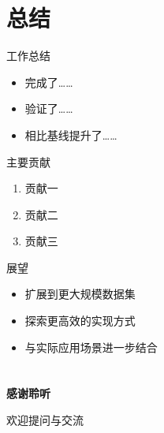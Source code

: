 \documentclass[10pt,aspectratio=169,mathserif]{beamer}
\begin{document}
\section{总结}

\begin{frame}{工作总结}
    \begin{itemize}
        \item 完成了……
        \item 验证了……
        \item 相比基线提升了……
    \end{itemize}

    \vspace{0.5cm}
    \begin{block}{主要贡献}
        \begin{enumerate}
            \item 贡献一
            \item 贡献二
            \item 贡献三
        \end{enumerate}
    \end{block}
\end{frame}

\begin{frame}{展望}
    \begin{itemize}
        \item 扩展到更大规模数据集
        \item 探索更高效的实现方式
        \item 与实际应用场景进一步结合
    \end{itemize}
\end{frame}

\section*{}

\begin{frame}
    \vfill
    \centering
    \Huge\textbf{感谢聆听}

    \vspace{1cm}

    \Large 欢迎提问与交流
    \vfill
\end{frame}
\end{document}
